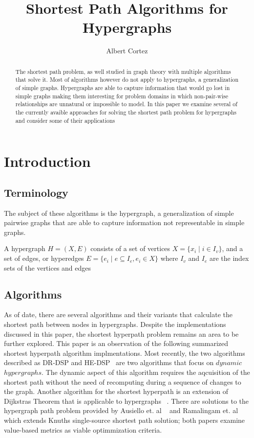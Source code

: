 \documentclass[10pt]{article}
\title{Shortest Path Algorithms for Hypergraphs}
\author{Albert Cortez}
\begin{document}
\maketitle
\begin{abstract}
The shortest path problem, as well studied in graph theory with multiple algorithms that solve it. Most of algorithms however do not apply to hypergraphs, a generalization of simple graphs. Hypergraphs are able to capture information that would go lost in simple graphs making them interesting for problem domains in which non-pair-wise relationships are unnatural or impossible to model. In this paper we examine several of the currently avaible approaches for solving the shortest path problem for hypergraphs and consider some of their applications
\end{abstract}

\section{Introduction}
\subsection{Terminology}
The subject of these algorithms is the hypergraph, a generalization of simple pairwise graphs that are able to capture information not representable in simple graphs. 

A hypergraph $H = (X, E)$ consists of a set of vertices $X=\{x_i \mid i \in I_v\}$, and a set of edges, or hyperedges $E=\{e_i \mid e \subseteq I_e, e_i \in X\}$ where $I_v$ and $I_e$ are the index sets of the vertices and edges


 
\subsection{Algorithms}
As of date, there are several algorithms and their  variants that calculate the shortest path between nodes in hypergraphs. Despite the implementations discussed in this paper, the shortest hyperpath problem remains an area to be further explored.
This paper is an observation of the following summarized shortest hyperpath algorithm implmentations. Most recently, the two algorithms described as DR-DSP and HE-DSP~\cite{dynShortPath} are two algorithms that focus on $dynamic$ $hypergraphs$. The dynamic aspect of this algorithm requires the aqcuisition of the shortest path without the need of recomputing during a sequence of changes to the graph. Another algorithm for the shortest hyperpath is an extension of Dijkstras Theorem that is applicable to hypergraphs ~\cite{GALLO1993177}. There are solutions to the hypergraph path problem provided by Ausiello et. al ~\cite{Ausiello92optimaltraversal} and Ramalingam et. al ~\cite{RAMALINGAM1996267} which extends Knuths single-source shortest path solution; both papers examine value-based metrics as viable optimmization criteria.
\end{document}
